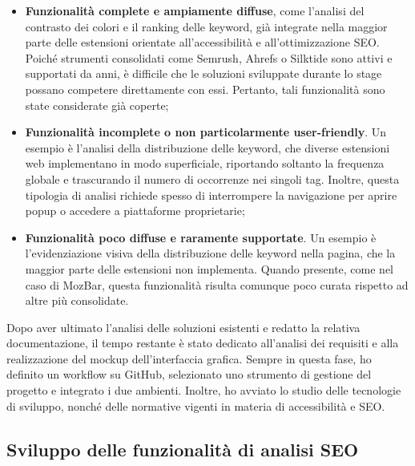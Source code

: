 \begin{itemize}
  \item \textbf{Funzionalità complete e ampiamente diffuse}, come l’analisi del contrasto dei colori e il ranking delle keyword, già integrate nella maggior parte delle estensioni orientate all’accessibilità e all’ottimizzazione SEO. Poiché strumenti consolidati come Semrush, Ahrefs o Silktide sono attivi e supportati da anni, è difficile che le soluzioni sviluppate durante lo stage possano competere direttamente con essi. Pertanto, tali funzionalità sono state considerate già coperte;
  \item \textbf{Funzionalità incomplete o non particolarmente user-friendly}. Un esempio è l’analisi della distribuzione delle keyword, che diverse estensioni web implementano in modo superficiale, riportando soltanto la frequenza globale e trascurando il numero di occorrenze nei singoli tag. Inoltre, questa tipologia di analisi richiede spesso di interrompere la navigazione per aprire popup o accedere a piattaforme proprietarie;
  \item \textbf{Funzionalità poco diffuse e raramente supportate}. Un esempio è l’evidenziazione visiva della distribuzione delle keyword nella pagina, che la maggior parte delle estensioni non implementa. Quando presente, come nel caso di MozBar, questa funzionalità risulta comunque poco curata rispetto ad altre più consolidate.
\end{itemize}

\par\noindent Dopo aver ultimato l’analisi delle soluzioni esistenti e redatto la relativa documentazione, il tempo restante è stato dedicato all’analisi dei requisiti e alla realizzazione del mockup dell’interfaccia grafica. Sempre in questa fase, ho definito un workflow su GitHub, selezionato uno strumento di gestione del progetto e integrato i due ambienti. Inoltre, ho avviato lo studio delle tecnologie di sviluppo, nonché delle normative vigenti in materia di accessibilità e SEO.

\subsection{Sviluppo delle funzionalità di analisi SEO}

